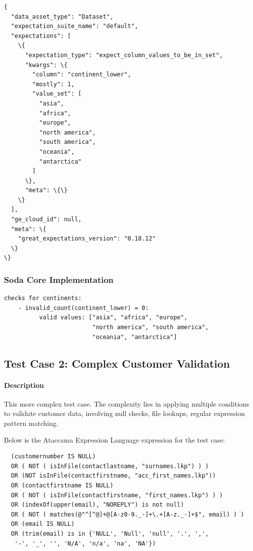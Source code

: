 \begin{verbatim}
{
  "data_asset_type": "Dataset",
  "expectation_suite_name": "default",
  "expectations": [
    \{
      "expectation_type": "expect_column_values_to_be_in_set",
      "kwargs": \{
        "column": "continent_lower",
        "mostly": 1,
        "value_set": [
          "asia",
          "africa",
          "europe",
          "north america",
          "south america",
          "oceania",
          "antarctica"
        ]
      \},
      "meta": \{\}
    \}
  ],
  "ge_cloud_id": null,
  "meta": \{
    "great_expectations_version": "0.18.12"
  \}
\}
\end{verbatim}

\subsubsection{Soda Core Implementation}

\begin{verbatim}
checks for continents:
    - invalid_count(continent_lower) = 0:
          valid values: ["asia", "africa", "europe", 
                         "north america", "south america", 
                         "oceania", "antarctica"]
\end{verbatim}


\subsection{Test Case 2: Complex Customer Validation}

\paragraph{Description} This more complex test case. The complexity lies in applying multiple conditions to validate customer data, involving null checks, file lookups, regular expression pattern matching.

Below is the Ataccama Expression Language expression for the test case:

\begin{verbatim}
  (customernumber IS NULL)
  OR ( NOT ( isInFile(contactlastname, "surnames.lkp") ) ) 
  OR (NOT isInFile(contactfirstname, "acc_first_names.lkp"))
  OR (contactfirstname IS NULL)
  OR ( NOT ( isInFile(contactfirstname, "first_names.lkp") ) )
  OR (indexOf(upper(email), "NOREPLY") is not null)
  OR ( NOT ( matches(@"^[^@]+@[A-z0-9._-]+\.+[A-z._-]+$", email) ) )
  OR (email IS NULL)
  OR (trim(email) is in {'NULL', 'Null', 'null', '.', ',',
   '-', '_', '', 'N/A', 'n/a', 'na', 'NA'})
\end{verbatim}

